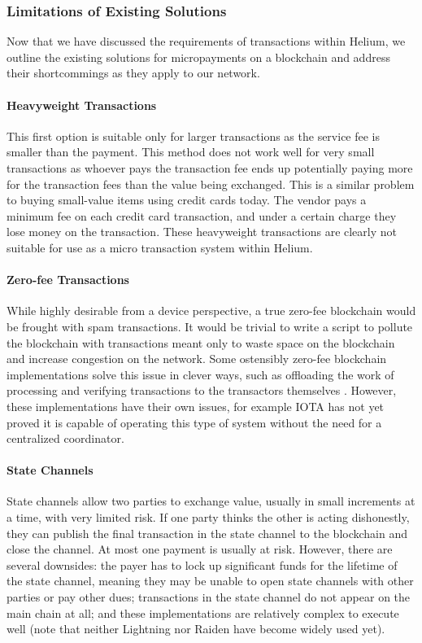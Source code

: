 \documentclass[UTF8, 10pt, nonatbib, nocopyrightspace, reprint]{sigplanconf}
\begin{document}
\subsubsection{Limitations of Existing Solutions}

Now that we have discussed the requirements of transactions within Helium, we outline the existing solutions for micropayments on a blockchain and address their shortcommings as they apply to our network.

\paragraph{Heavyweight Transactions}
This first option is suitable only for larger transactions as the service fee is smaller than the payment. This method does not work well for very small transactions as whoever pays the transaction fee ends up potentially paying more for the transaction fees than the value being exchanged. This is a similar problem to buying small-value items using credit cards today. The vendor pays a minimum fee on each credit card transaction, and under a certain charge they lose money on the transaction. These heavyweight transactions are clearly not suitable for use as a micro transaction system within Helium.

\paragraph{Zero-fee Transactions}
While highly desirable from a device perspective, a true zero-fee blockchain would be frought with spam transactions. It would be trivial to write a script to pollute the blockchain with transactions meant only to waste space on the blockchain and increase congestion on the network. Some ostensibly zero-fee blockchain implementations solve this issue in clever ways, such as offloading the work of processing and verifying transactions to the transactors themselves \cite{iota}. However, these implementations have their own issues, for example IOTA has not yet proved it is capable of operating this type of system without the need for a centralized coordinator.

\paragraph{State Channels}
State channels \cite{state-channels} allow two parties to exchange value, usually in small increments at a time, with very limited risk. If one party thinks the other is acting dishonestly, they can publish the final transaction in the state channel to the blockchain and close the channel. At most one payment is usually at risk. However, there are several downsides: the payer has to lock up significant funds for the lifetime of the state channel, meaning they may be unable to open state channels with other parties or pay other dues; transactions in the state channel do not appear on the main chain at all; and these implementations are relatively complex to execute well (note that neither Lightning \cite{lightning} nor Raiden \cite{raiden} have become widely used yet).
\end{document}
